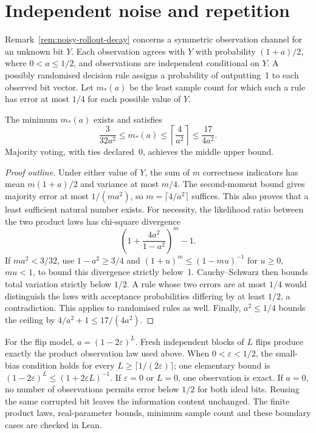 \documentclass[twoside,11pt]{article}
\numberwithin{theorem}{section}
\numberwithin{equation}{section}
\begin{document}
\section{Independent noise and repetition}
\label{app:noise-samples}

Remark~\ref{rem:noisy-rollout-decay} concerns a symmetric observation channel for an unknown bit $Y$. Each observation agrees with $Y$ with probability $(1+a)/2$, where $0<a\le1/2$, and observations are independent conditional on $Y$. A possibly randomised decision rule assigns a probability of outputting~1 to each observed bit vector. Let $m_*(a)$ be the least sample count for which such a rule has error at most $1/4$ for each possible value of $Y$.

\begin{proposition}
\label{prop:noise-samples}
The minimum $m_*(a)$ exists and satisfies
\[
\frac{3}{32a^2}\le m_*(a)\le\left\lceil\frac{4}{a^2}\right\rceil
\le\frac{17}{4a^2}.
\]
Majority voting, with ties declared~0, achieves the middle upper bound.
\end{proposition}
\begin{proof}[Proof outline]
Under either value of $Y$, the sum of $m$ correctness indicators has mean $m(1+a)/2$ and variance at most $m/4$. The second-moment bound gives majority error at most $1/(ma^2)$, so $m=\lceil4/a^2\rceil$ suffices. This also proves that a least sufficient natural number exists. For necessity, the likelihood ratio between the two product laws has chi-square divergence
\[
\left(1+\frac{4a^2}{1-a^2}\right)^m-1.
\]
If $ma^2<3/32$, use $1-a^2\ge3/4$ and
$(1+u)^m\le(1-mu)^{-1}$ for $u\ge0$, $mu<1$, to bound this divergence strictly below~1. Cauchy--Schwarz then bounds total variation strictly below $1/2$. A rule whose two errors are at most $1/4$ would distinguish the laws with acceptance probabilities differing by at least $1/2$, a contradiction. This applies to randomised rules as well. Finally, $a^2\le1/4$ bounds the ceiling by $4/a^2+1\le17/(4a^2)$.
\end{proof}

For the flip model, $a=(1-2\varepsilon)^L$. Fresh independent blocks of $L$ flips produce exactly the product observation law used above. When $0<\varepsilon<1/2$, the small-bias condition holds for every $L\ge\lceil1/(2\varepsilon)\rceil$; one elementary bound is $(1-2\varepsilon)^L\le(1+2\varepsilon L)^{-1}$. If $\varepsilon=0$ or $L=0$, one observation is exact. If $a=0$, no number of observations permits error below $1/2$ for both ideal bits. Reusing the same corrupted bit leaves the information content unchanged. The finite product laws, real-parameter bounds, minimum sample count and these boundary cases are checked in Lean.
\end{document}
